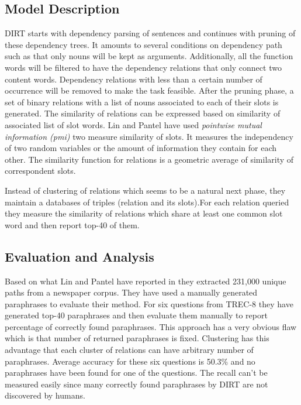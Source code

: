 \documentclass[12pt]{report}
\begin{document}
\subsection{Model Description}
\label{ch:dirt-model} 
DIRT starts with dependency parsing of sentences and continues with pruning of these dependency trees.
It amounts to several conditions on dependency path such as that only nouns will be kept as arguments. 
Additionally, all the function words will be filtered to have the dependency relations that only connect
two content words. Dependency relations with less than a certain number of occurrence will be removed to make the task feasible.
After the pruning phase, a set of binary relations with a list of nouns associated to each of their slots is generated. 
The similarity of relations can be expressed based on similarity of associated list of slot words. Lin and Pantel
have used \emph{pointwise mutual information (pmi)} two measure similarity of slots. 
It measures the independency of two random variables or the amount of
information they contain for each other. The similarity function for relations  is a geometric average
of similarity of correspondent slots.

Instead of clustering of relations which seems to be a natural next phase,
 they maintain a databases of triples (relation and its slots).For each relation queried
  they measure the similarity of relations which share at least one common slot word and then report top-40 of them.
  
\subsection{Evaluation and Analysis}
\label{ch:model} 
  
  Based on what Lin and Pantel have reported in \cite{Lin2001} they extracted 231,000 unique paths from a newspaper corpus.
  They have used a manually generated paraphrases to evaluate their method. For six questions from TREC-8 
  they have generated top-40 paraphrases and then evaluate them manually to report percentage of correctly found paraphrases.
  This approach has a very obvious flaw which is that number of returned paraphrases is fixed. Clustering has this 
  advantage that each cluster of relations can have arbitrary number of paraphrases.
  Average accuracy for these six questions is 50.3\% and no paraphrases have been found for one of the questions.
  The recall can't be measured easily since many correctly found paraphrases by DIRT are not discovered by humans.
  
\end{document}

